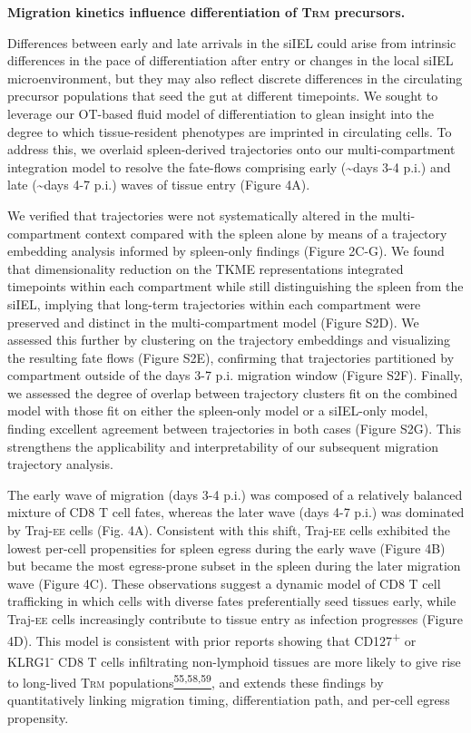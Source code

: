 \textbf{Migration kinetics influence differentiation of T\textsc{rm}
precursors. }

Differences between early and late arrivals in the siIEL could arise
from intrinsic differences in the pace of differentiation after entry or
changes in the local siIEL microenvironment, but they may also reflect
discrete differences in the circulating precursor populations that seed
the gut at different timepoints. We sought to leverage our OT-based
fluid model of differentiation to glean insight into the degree to which
tissue-resident phenotypes are imprinted in circulating cells. To
address this, we overlaid spleen-derived trajectories onto our
multi-compartment integration model to resolve the fate-flows comprising
early (\textasciitilde{}days 3-4 p.i.) and late (\textasciitilde{}days
4-7 p.i.) waves of tissue entry (Figure 4A).

We verified that trajectories were not systematically altered in the
multi-compartment context compared with the spleen alone by means of a
trajectory embedding analysis informed by spleen-only findings (Figure
2C-G). We found that dimensionality reduction on the TKME
representations integrated timepoints within each compartment while
still distinguishing the spleen from the siIEL, implying that long-term
trajectories within each compartment were preserved and distinct in the
multi-compartment model (Figure S2D). We assessed this further by
clustering on the trajectory embeddings and visualizing the resulting
fate flows (Figure S2E), confirming that trajectories partitioned by
compartment outside of the days 3-7 p.i. migration window (Figure S2F).
Finally, we assessed the degree of overlap between trajectory clusters
fit on the combined model with those fit on either the spleen-only model
or a siIEL-only model, finding excellent agreement between trajectories
in both cases (Figure S2G). This strengthens the applicability and
interpretability of our subsequent migration trajectory analysis.

The early wave of migration (days 3-4 p.i.) was composed of a relatively
balanced mixture of CD8 T cell fates, whereas the later wave (days 4-7
p.i.) was dominated by Traj-\textsc{ee} cells (Fig. 4A). Consistent with
this shift, Traj-\textsc{ee} cells exhibited the lowest per-cell
propensities for spleen egress during the early wave (Figure 4B) but
became the most egress-prone subset in the spleen during the later
migration wave (Figure 4C). These observations suggest a dynamic model
of CD8 T cell trafficking in which cells with diverse fates
preferentially seed tissues early, while Traj-\textsc{ee} cells
increasingly contribute to tissue entry as infection progresses (Figure
4D). This model is consistent with prior reports showing that
CD127\textsuperscript{+} or KLRG1\textsuperscript{-} CD8 T cells
infiltrating non-lymphoid tissues are more likely to give rise to
long-lived T\textsc{rm}
populations\href{https://sciwheel.com/work/citation?ids=4577165,1028483,1307038\&pre=\&pre=\&pre=\&suf=\&suf=\&suf=\&sa=0,0,0\&dbf=0\&dbf=0\&dbf=0}{\textsuperscript{55,58,59}},
and extends these findings by quantitatively linking migration timing,
differentiation path, and per-cell egress propensity.

